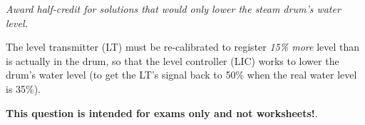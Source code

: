 
{\it Award half-credit for solutions that would only  lower the steam drum's water level.}

\vskip 10pt

The level transmitter (LT) must be re-calibrated to register {\it 15\% more} level than is actually in the drum, so that the level controller (LIC) works to lower the drum's water level (to get the LT's signal back to 50\% when the real water level is 35\%).







{\bf This question is intended for exams only and not worksheets!}.



